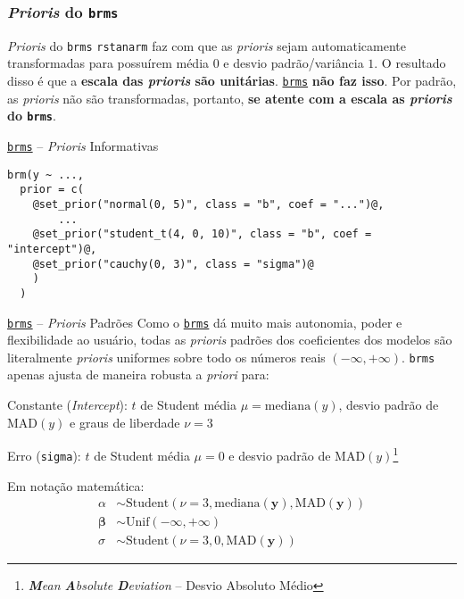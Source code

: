 \subsubsection{\textit{Prioris} do \texttt{brms}}
\begin{frame}{\textit{Prioris} do \texttt{brms}}
    \texttt{rstanarm} faz com que as \textit{prioris} sejam automaticamente
    transformadas para possuírem média $0$ e desvio padrão/variância $1$. O resultado
    disso é que a \textbf{escala das \textit{prioris} são unitárias}.
    \vfill
    \href{https://paul-buerkner.github.io/brms/}{\texttt{brms}} \textbf{não faz isso}.
    Por padrão, as \textit{prioris} não são transformadas, portanto, \textbf{se
    atente com a escala as \textit{prioris} do \texttt{brms}}.
\end{frame}

\begin{frame}[fragile]{\href{https://paul-buerkner.github.io/brms/}{\texttt{brms}} -- \textit{Prioris} Informativas}
    \begin{lstlisting}[basicstyle=\small]
brm(y ~ ...,
  prior = c(
    @set_prior("normal(0, 5)", class = "b", coef = "...")@,
        ...
    @set_prior("student_t(4, 0, 10)", class = "b", coef = "intercept")@,
    @set_prior("cauchy(0, 3)", class = "sigma")@
    )
  )
    \end{lstlisting}
\end{frame}

\begin{frame}{\href{https://paul-buerkner.github.io/brms/}{\texttt{brms}} -- \textit{Prioris} Padrões}
    Como o \href{https://paul-buerkner.github.io/brms/}{\texttt{brms}} dá
    muito mais autonomia, poder e flexibilidade ao usuário, todas as \textit{prioris}
    padrões dos coeficientes dos modelos são literalmente \textit{prioris} uniformes
    sobre todo os números reais $(-\infty, +\infty)$. \texttt{brms} apenas ajusta de
    maneira robusta a \textit{priori} para:
    \begin{vfilleditems}
        \item Constante (\textit{Intercept}): $t$ de Student média $\mu = \text{mediana}(y)$, desvio padrão de $\text{MAD}(y)$ e graus de liberdade $\nu = 3$
        \item Erro (\texttt{sigma}): $t$ de Student média $\mu = 0$ e desvio padrão de $\text{MAD}(y)$\footnote{\textit{\textbf{M}ean \textbf{A}bsolute \textbf{D}eviation} -- Desvio Absoluto Médio}
    \end{vfilleditems}
Em notação matemática:
$$
\begin{aligned}
\alpha &\sim \text{Student}(\nu=3, \text{mediana}({\boldsymbol{y}}), \text{MAD}({\boldsymbol{y}}))\\
\boldsymbol{\beta} &\sim \text{Unif}(-\infty, + \infty) \\
\sigma &\sim \text{Student}(\nu=3, 0, \text{MAD}({\boldsymbol{y}}))
\end{aligned}
$$
\end{frame}
